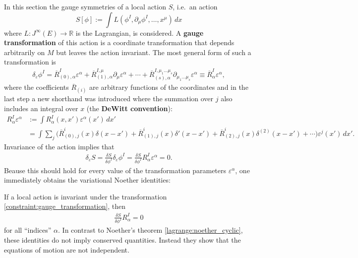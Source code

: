     In this section the gauge symmetries of a local action $S$, i.e.~an action \[S[\phi] := \int L(\phi^I,\partial_\mu\phi^I,\ldots,x^\mu)\,dx\] where $L:J^\infty(E)\rightarrow\mathbb{R}$ is the Lagrangian, is considered. A \textbf{gauge transformation} of this action is a coordinate transformation that depends arbitrarily on $M$ but leaves the action invariant. The most general form of such a transformation is
    \begin{gather}
        \label{constraint:gauge_transformation}
        \delta_\varepsilon\phi^I = \overline{R}^I_{(0),\alpha}\varepsilon^\alpha + \overline{R}^{I,\mu}_{(1),\alpha}\partial_\mu\varepsilon^\alpha + \cdots + \overline{R}^{I,\mu_1\ldots\mu_s}_{(s),\alpha}\partial_{\mu_1\ldots\mu_s}\varepsilon^\alpha\equiv \overline{R}^I_\alpha\varepsilon^\alpha,
    \end{gather}
    where the coefficients $\overline{R}_{(i)}$ are arbitrary functions of the coordinates and in the last step a new shorthand was introduced where the summation over $j$ also includes an integral over $x$ (the \textbf{DeWitt convention}):
    \begin{align}
        R^I_\alpha\varepsilon^\alpha &:= \int R^I_\alpha(x,x')\varepsilon^\alpha(x')\,dx'\\
        &= \int\sum_j\Big(\overline{R}^i_{(0),j}(x)\delta(x-x')+\overline{R}^i_{(1),j}(x)\delta'(x-x')+\overline{R}^i_{(2),j}(x)\delta^{(2)}(x-x')+\cdots\Big)\varepsilon^j(x')\,dx'.\nonumber
    \end{align}
    Invariance of the action implies that
    \begin{gather}
        \delta_\varepsilon S = \frac{\delta S}{\delta\phi^I}\delta_\varepsilon\phi^I = \frac{\delta S}{\delta\phi^I}R^I_\alpha\varepsilon^\alpha = 0.
    \end{gather}
    Beause this should hold for every value of the transformation parameters $\varepsilon^\alpha$, one immediately obtains the variational Noether identities:
    \begin{property}\label{field:noether_identity}
        If a local action is invariant under the transformation \eqref{constraint:gauge_transformation}, then
        \begin{gather}
            \frac{\delta S}{\delta\phi^I}R^I_\alpha = 0
        \end{gather}
        for all ``indices'' $\alpha$. In contrast to Noether's theorem \ref{lagrange:noether_cyclic}, these identities do not imply conserved quantities. Instead they show that the equations of motion are not independent.
    \end{property}
